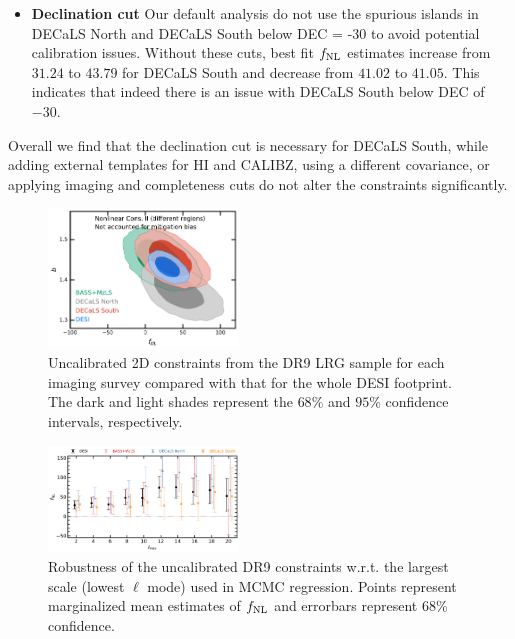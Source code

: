 \begin{itemize}
\item \textbf{Declination cut} Our default analysis do not use the spurious islands in DECaLS North and DECaLS South below DEC = -30 to avoid potential calibration issues.  Without these cuts, best fit $f_{\rm NL}$ estimates increase from $31.24$ to $43.79$ for DECaLS South and decrease from $41.02$ to $41.05$. This indicates that indeed there is an issue with DECaLS South below DEC of $-30$.

\end{itemize}

Overall we find that the declination cut is necessary for DECaLS South, while adding external templates for HI and CALIBZ, using a different covariance, or applying imaging and completeness cuts do not alter the constraints significantly.


\begin{figure}
    \centering
    \includegraphics[width=0.45\textwidth]{figures/mcmc_dr9regions.pdf} 
    \caption{Uncalibrated 2D constraints from the DR9 LRG sample for each imaging survey compared with that for the whole DESI footprint. The dark and light shades represent the $68\%$ and $95\%$ confidence intervals, respectively.}\label{fig:mcmc_dr9reg}
\end{figure}




\begin{figure}
    \centering
    \includegraphics[width=0.45\textwidth]{figures/fnl_elmin.pdf}     
    \caption{Robustness of the uncalibrated DR9 constraints w.r.t. the largest scale (lowest $\ell$ mode) used in MCMC regression. Points represent marginalized mean estimates of $f_{\rm NL}$ and errorbars represent $68$\% confidence.}\label{fig:mcmc_dr9elmin}
\end{figure}



